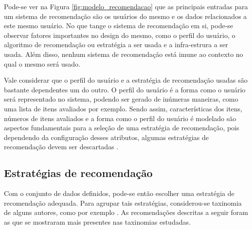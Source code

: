 Pode-se ver na Figura \ref{fig:modelo_recomendacao} que as principais entradas
para um sistema de recomendação são os usuários do mesmo e os dados relacionados
a este mesmo usuário. No que tange o sistema de recomendação em si, pode-se
observar fatores importantes no design do mesmo, como o perfil do usuário, o
algoritmo de recomendação ou estratégia a ser usada e a infra-estrura a ser
usada. Além disso, nenhum sistema de recomendação está imune ao contexto no qual
o mesmo será usado.

Vale considerar que o perfil do usuário e a estratégia de recomendação usadas
são bastante dependentes um do outro. O perfil do usuário é a forma como o
usuário será representado no sistema, podendo ser gerado de inúmeras maneiras,
como uma lista de itens avaliados por exemplo. Sendo assim, características dos itens,
números de itens avaliados e a forma como o perfil do usuário é modelado são aspectos
fundamentais para a seleção de uma estratégia de recomendação, pois dependendo
da configuração desses atributos, algumas estratégias
de recomendação devem ser descartadas \cite{picault2011get}.

\subsection{Estratégias de recomendação} \label{sec:estrategias_recomendacao}

Com o conjunto de dados definidos, pode-se então escolher uma estratégia de
recomendação adequada. Para agrupar tais estratégias, considerou-se taxinomia de
alguns autores, como por exemplo \cite{burke2007hybrid}. As recomendações
descritas a seguir foram as que se mostraram mais presentes nas taxinomias
estudadas.

